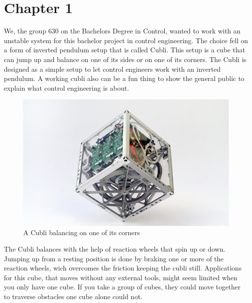 \chapter{Chapter 1}
We, the group 630 on the Bachelors Degree in Control, wanted to work with an unstable system for this bachelor project in control engineering. The choice fell on a form of inverted pendulum setup that is called Cubli. This setup is a cube that can jump up and balance on one of its sides or on one of its corners.
The Cubli is designed as a simple setup to let control engineers work with an inverted pendulum. A working cubli also can be a fun thing to show the general public to explain what control engineering is about.  \cite{MGajamohan}

\begin{figure}[H] 
	\centering 
	\includegraphics[scale=1.3]{figures/CubliCorner-700x430}
	\caption{A Cubli balancing on one of its corners\cite{RAndrea}}
	\label{CubliCorner}
\end{figure} 
The Cubli balances with the help of reaction wheels that spin up or down. Jumping up from a resting position is done by braking one or more of the reaction wheels, wich overcomes the friction keeping the cubli still. 
Applications for this cube, that moves without any external tools, might seem limited when you only have one cube. If you take a group of cubes, they could move together to traverse obstacles one cube alone could not. \cite{JRomanishin}

